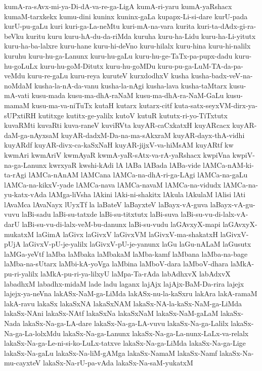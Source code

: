 {kumA-ra-sAvx-mi-ya-Di-dA-va-re-ga-LigA
kumA-ri-yaru
kumA-yaRshacx
kumaM-tarxkekx
kumu-dini
kuninx
kuninx-gaLa
kupapx-Li-si-dare
kurU-pada
kurU-pu-gaLu
kuri
kuri-ga-La-neMtu
kuri-mA-na-vara
kurita
kuri-ta-dAdx-gi-ra-beVku
kuritu
kuru
kuru-hA-du-da-riMda
kuruha
kuru-ha-Lidu
kuru-ha-Li-yitutx
kuru-ha-ba-lalxre
kuru-hane
kuru-hi-deVno
kuru-hilalx
kuru-hina
kuru-hi-nalilx
kuruhu
kuru-hu-ga-Lanunx
kuru-hu-gaLu
kuru-hu-ge-TaTx-pa-pupx-dadu
kuru-hu-goLuLx
kuru-hu-goM-Ditutx
kuru-hu-goMDu
kuru-pu-ga-LuM-TA-da-pa-veMdu
kuru-re-gaLu
kuru-reya
kuruteV
kurxdodhxV
kusha
kusha-badx-veV-na-noMdaM
kusha-la-nA-da-vanu
kusha-la-nAgi
kusha-lava
kusha-taMtarx
kusu-mA-vati
kusu-mada
kusu-ma-dhA-raNaM
kusu-ma-dhA-ra-NaM-GaLu
kusu-mamaM
kusu-ma-va-niTuTx
kutaH
kutarx
kutarx-citf
kuta-satx-seyxVM-dirx-ya-sUPxtiRH
kutitxge
kutitx-ge-yalilx
kutoV
kutuR
kututx-ri-yo-TiTxtutx
kuvaRMti
kuvaRti
kuva-raneV
kuviRVta
kuyAR-caCxkatxH
kuyARcacx
kuyAR-daM-ga-nAyxsaM
kuyAR-dadxM-Da-na-ma-sAkxraM
kuyAR-dayx-thA-vidhi
kuyARdf
kuyAR-divx-ca-kaSxNaH
kuyAR-jijxV-va-hiMsAM
kuyARtf
kw
kwmAri
kwmAriV
kwmAyaR
kwmA-yaR-sAtx-va-rA-yaRshacx
kwpiVna
kwpiV-na-ga-Lanunx
kwrxyaR
kwshi-kAdi
lA
lABa
lABada
lABa-vide
lAMCa-nAM-ki-ta-rAgi
lAMCa-nAnAM
lAMCana
lAMCa-na-dhA-ri-ga-LAgi
lAMCa-na-gaLu
lAMCa-na-kikxV-yade
lAMCa-nava
lAMCa-navaM
lAMCa-na-vidudx
lAMCa-na-yu-katx-vAda
lAMga-liVsha
lAkini
lAki-ni-shakitx
lAkula
lAkulaM
lAlisi
lAti
lAvaMca
lAvaNayx
lUyxTf
la
laBateV
laBayxteV
laBayx-vA-guva
laBayx-vA-gu-vuvu
laBi-sadu
laBi-su-tatxde
laBi-su-titxtutx
laBi-suva
laBi-su-vu-di-lalx-vA-darU
laBi-su-vu-di-lalx-veM-bu-danunx
laBi-su-vudu
laGAvxyX-mapi
laGAvxyX-mukatxM
laGimA
laGivx
laGivxV
laGivxVM
laGivxV-ma-shakatxH
laGivxV-pUjA
laGivxV-pU-je-yalilx
laGivxV-pU-je-yanunx
laGu
laGu-nALaM
laGusutx
laMGa-yeVtf
laMba
laMbaka
laMbakaM
laMba-kamf
laMbana
laMba-na-bage
laMba-na-sUtarx
laMbi-kA-yoVga
laMbina
laMboV-dara
laMboV-dhara
laMkA-pu-ri-yalilx
laMkA-pu-ri-ya-lilxyU
laMpa-Ta-rAda
labAdhxvX
labAdxvX
labadhxM
labadhx-midaM
lade
ladu
laganx
lajAjx
lajAjx-BaM-Da-rira
lajejx
lajejx-ya-neVna
lakASx-NaM-ga-LiMda
lakASx-nu-la-kaSxru
lakAra
lakA-ramaM
lakA-ravu
lakaSx
lakaSxNA
lakaSxNAM
lakaSx-NA-la-kaSx-NaM-ga-LiMda
lakaSx-NAni
lakaSx-NAtf
lakaSxNa
lakaSxNaM
lakaSx-NaM-gaLaM
lakaSx-Nada
lakaSx-Na-ga-LA-dare
lakaSx-Na-ga-LA-vuvu
lakaSx-Na-ga-Lalilx
lakaSx-Na-ga-La-lolxMdu
lakaSx-Na-ga-Lanunx
lakaSx-Na-ga-La-nunx-LaLx-va-relalx
lakaSx-Na-ga-Le-ni-si-ko-LuLx-tatxve
lakaSx-Na-ga-LiMda
lakaSx-Na-ga-Lige
lakaSx-Na-gaLu
lakaSx-Na-liM-gAMga
lakaSx-NamaM
lakaSx-Namf
lakaSx-Na-mu-cayxteV
lakaSx-Na-rU-pa-vAda
lakaSx-Na-saM-yukatxM
}
